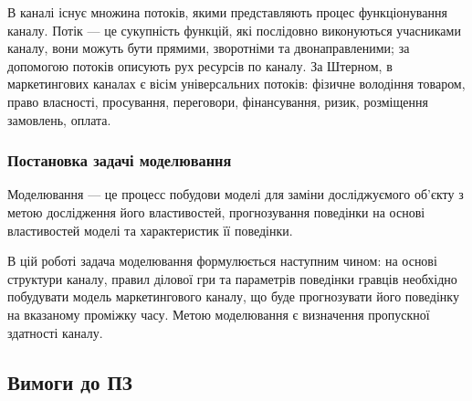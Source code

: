 В каналі існує множина потоків, якими представляють процес функціонування каналу. Потік --- це сукупність функцій, які послідовно виконуються учасниками каналу, вони можуть бути прямими, зворотніми та двонаправленими; за допомогою потоків описують рух ресурсів по каналу. За Штерном, в маркетингових каналах є вісім універсальних потоків\cite{stern}: фізичне володіння товаром, право власності, просування, переговори, фінансування, ризик, розміщення замовлень, оплата.

    \subsubsection{Постановка задачі моделювання}

Моделювання --- це процесс побудови моделі для заміни досліджуємого об’єкту з метою дослідження його властивостей, прогнозування поведінки на основі властивостей моделі та характеристик її поведінки\cite{model}.
 
В цій роботі задача моделювання формулюється наступним чином: на основі структури каналу, правил ділової гри та параметрів поведінки гравців необхідно побудувати модель маркетингового каналу, що буде прогнозувати його поведінку на вказаному проміжку часу. Метою моделювання є визначення пропускної здатності каналу.


    \subsection{Вимоги до ПЗ}
